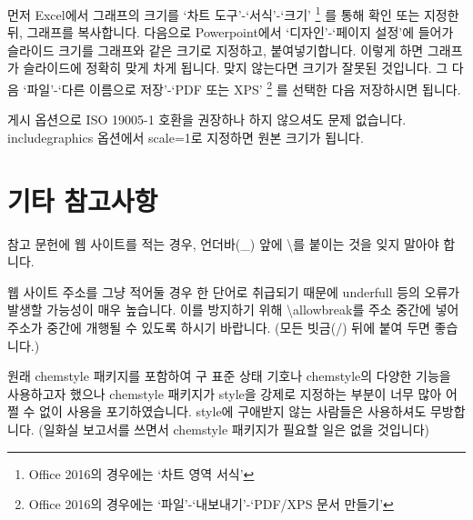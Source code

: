 \documentclass[a4paper,10pt]{article}
\begin{document}
	먼저 Excel에서 그래프의 크기를 `차트 도구'-`서식'-`크기'
	\footnote{Office 2016의 경우에는 `차트 영역 서식'}
	를 통해 확인 또는 지정한 뒤, 그래프를 복사합니다.
	다음으로 Powerpoint에서 `디자인'-`페이지 설정'에 들어가 슬라이드 크기를
	그래프와 같은 크기로 지정하고, 붙여넣기합니다.
	이렇게 하면 그래프가 슬라이드에 정확히 맞게 차게 됩니다.
	맞지 않는다면 크기가 잘못된 것입니다.
	그 다음 `파일'-`다른 이름으로 저장'-`PDF 또는 XPS'
	\footnote{Office 2016의 경우에는 `파일'-`내보내기'-`PDF/XPS 문서 만들기'}
	를 선택한 다음 저장하시면 됩니다. 
	
	
	게시 옵션으로 ISO 19005-1 호환을 권장하나 하지 않으셔도 문제 없습니다.
	includegraphics 옵션에서 scale=1로 지정하면 원본 크기가 됩니다.
	
	\section{기타 참고사항}
	참고 문헌에 웹 사이트를 적는 경우, 언더바(\_) 앞에 \textbackslash 를
	붙이는 것을 잊지 말아야 합니다.
	
	웹 사이트 주소를 그냥 적어둘 경우 한 단어로 취급되기 때문에 underfull 
	등의 오류가 발생할 가능성이 매우 높습니다.
	이를 방지하기 위해 \textbackslash allowbreak를 주소 중간에 넣어 주소가
	중간에 개행될 수 있도록 하시기 바랍니다.
	(모든 빗금(/) 뒤에 붙여 두면 좋습니다.)	
	
	원래 chemstyle 패키지를 포함하여 구 표준 상태 기호나 chemstyle의 
	다양한 기능을 사용하고자 했으나 chemstyle 패키지가 style을 강제로
	지정하는 부분이 너무 많아 어쩔 수 없이 사용을 포기하였습니다.
	style에 구애받지 않는 사람들은 사용하셔도 무방합니다.
	(일화실 보고서를 쓰면서 chemstyle 패키지가 필요할 일은 없을 것입니다)
	
\end{document}
